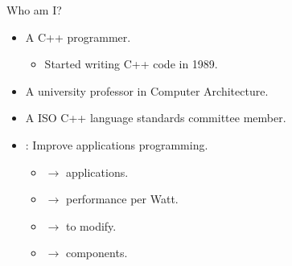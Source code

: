 \begin{frame}[t]{Who am I?}
\begin{itemize}
  \item A C++ programmer.
    \begin{itemize}
      \item Started writing C++ code in 1989.
    \end{itemize}
  \vfill\pause
  \item A university professor in Computer Architecture.
  \vfill\pause
  \item A ISO C++ language standards committee member.
  \vfill\pause
  \item {}: Improve applications programming.
    \begin{itemize}
      \item {} $\rightarrow$  applications.
      \item {} $\rightarrow$  performance per Watt.
      \item {} $\rightarrow$  to modify.
      \item {} $\rightarrow$  components.
    \end{itemize}
\end{itemize}
\end{frame}
